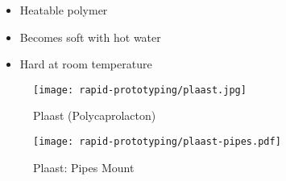 \begin{frame}
    \begin{itemize}
        \item Heatable polymer
        \item Becomes soft with hot water
        \item Hard at room temperature
    \end{itemize}
    \begin{figure}
        \texttt{[image: rapid-prototyping/plaast.jpg]}
        \caption{Plaast (Polycaprolacton)}
    \end{figure}
\end{frame}

\begin{frame}
    \begin{figure}
        \texttt{[image: rapid-prototyping/plaast-pipes.pdf]}
        \caption{Plaast: Pipes Mount}
    \end{figure}
\end{frame}
